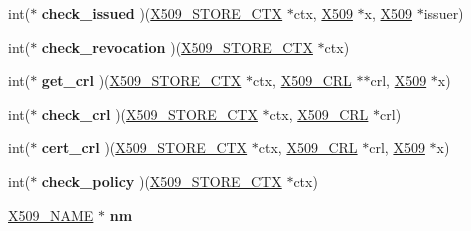 \begin{DoxyCompactItemize}
\item 
\hypertarget{structx509__store__ctx__st_af1c8a974d279ded984821b37c2cd2b4c}{}int($\ast$ {\bfseries check\+\_\+issued} )(\hyperlink{structx509__store__ctx__st}{X509\+\_\+\+S\+T\+O\+R\+E\+\_\+\+C\+T\+X} $\ast$ctx, \hyperlink{structx509__st}{X509} $\ast$x, \hyperlink{structx509__st}{X509} $\ast$issuer)\label{structx509__store__ctx__st_af1c8a974d279ded984821b37c2cd2b4c}

\item 
\hypertarget{structx509__store__ctx__st_a15bc54f186c068f3eb8a256d696c6fce}{}int($\ast$ {\bfseries check\+\_\+revocation} )(\hyperlink{structx509__store__ctx__st}{X509\+\_\+\+S\+T\+O\+R\+E\+\_\+\+C\+T\+X} $\ast$ctx)\label{structx509__store__ctx__st_a15bc54f186c068f3eb8a256d696c6fce}

\item 
\hypertarget{structx509__store__ctx__st_a9b8772fbdd21b22482593ee27db9d12d}{}int($\ast$ {\bfseries get\+\_\+crl} )(\hyperlink{structx509__store__ctx__st}{X509\+\_\+\+S\+T\+O\+R\+E\+\_\+\+C\+T\+X} $\ast$ctx, \hyperlink{struct_x509__crl__st}{X509\+\_\+\+C\+R\+L} $\ast$$\ast$crl, \hyperlink{structx509__st}{X509} $\ast$x)\label{structx509__store__ctx__st_a9b8772fbdd21b22482593ee27db9d12d}

\item 
\hypertarget{structx509__store__ctx__st_a6a39a62fb969f4dc15e782de8a895a2f}{}int($\ast$ {\bfseries check\+\_\+crl} )(\hyperlink{structx509__store__ctx__st}{X509\+\_\+\+S\+T\+O\+R\+E\+\_\+\+C\+T\+X} $\ast$ctx, \hyperlink{struct_x509__crl__st}{X509\+\_\+\+C\+R\+L} $\ast$crl)\label{structx509__store__ctx__st_a6a39a62fb969f4dc15e782de8a895a2f}

\item 
\hypertarget{structx509__store__ctx__st_a76329537e9627b1c18140ae28649aeb2}{}int($\ast$ {\bfseries cert\+\_\+crl} )(\hyperlink{structx509__store__ctx__st}{X509\+\_\+\+S\+T\+O\+R\+E\+\_\+\+C\+T\+X} $\ast$ctx, \hyperlink{struct_x509__crl__st}{X509\+\_\+\+C\+R\+L} $\ast$crl, \hyperlink{structx509__st}{X509} $\ast$x)\label{structx509__store__ctx__st_a76329537e9627b1c18140ae28649aeb2}

\item 
\hypertarget{structx509__store__ctx__st_a3e0bffe45fdc52dc8505a640433da741}{}int($\ast$ {\bfseries check\+\_\+policy} )(\hyperlink{structx509__store__ctx__st}{X509\+\_\+\+S\+T\+O\+R\+E\+\_\+\+C\+T\+X} $\ast$ctx)\label{structx509__store__ctx__st_a3e0bffe45fdc52dc8505a640433da741}

\item 
\hypertarget{structx509__store__ctx__st_acf969b12cb5d9346d04e2e2865d5e934}{}\hyperlink{struct_x509__name__st}{X509\+\_\+\+N\+A\+M\+E} $\ast$ {\bfseries nm}\label{structx509__store__ctx__st_acf969b12cb5d9346d04e2e2865d5e934}


\end{DoxyCompactItemize}
